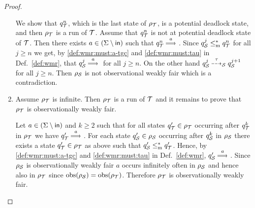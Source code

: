 \begin{proof}
\begin{enumerate}[label=2.\arabic*:, ref=(2.\arabic*), leftmargin=*,start=1]
            We show that $q^n_\T$, which is the last state of $\rho_\T$, is a potential deadlock state, and then $\rho_\T$ is a run of $\T$. 
            Assume that $q^n_\T$ is not at potential deadlock state of $\T$. Then there exists $a \in (\Sigma \setminus \inset)$ such that $q^n_\T \mustw{a} \stateTGC$. Since $q^j_\S \mrw q^n_\T$ for all $j \geq n$ we get, by \ref{def:wmr:must:a-tgc} and \ref{def:wmr:must:tau} in Def.~\ref{def:wmr}, that $q^j_\S \mustw{a}\stateTGC$ for all $j \geq n$. On the other hand $q^j_\S \may{\tau}_\S q^{j+1}_\S$ for all $j \geq n$. Then $\rho_\S$ is not observational weakly fair which is a contradiction.

            \item Assume $\rho_\T$ is infinite. 
            Then $\rho_\T$ is a run of $\T$ and it remains to prove that $\rho_\T$ is observationally weakly fair.
            
            Let $a \in (\Sigma \setminus \inset)$ and $k \geq 2$ such that for all states $q'_\T \in \rho_\T$ occurring after $q^k_\T$ in $\rho_\T$ we have $q'_\T \mustw{a} \stateTGC$.
                For each state $q'_\S \in \rho_\S$ occurring after $q^k_\S$ in $\rho_\S$ there exists a state $q'_\T \in \rho_\T$ as above such that $q'_\S \mrw q'_\T$. Hence, by \ref{def:wmr:must:a-tgc} and \ref{def:wmr:must:tau} in Def.~\ref{def:wmr}, $q'_\S \mustw{a} \stateTGC$. Since $\rho_\S$ is observationally weakly fair $a$ occurs infinitely often in $\rho_\S$ and hence also in $\rho_\T$ since $\obsa(\rho_\S) = \obsa(\rho_\T)$. Therefore $\rho_\T$ is observationally weakly fair.
        \end{enumerate}    
\end{proof}

